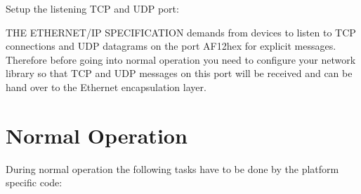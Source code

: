 \begin{DoxyEnumerate}
\item \-Setup the listening \-T\-C\-P and \-U\-D\-P port\-:\par
 \-T\-H\-E \-E\-T\-H\-E\-R\-N\-E\-T/\-I\-P \-S\-P\-E\-C\-I\-F\-I\-C\-A\-T\-I\-O\-N demands from devices to listen to \-T\-C\-P connections and \-U\-D\-P datagrams on the port \-A\-F12hex for explicit messages. \-Therefore before going into normal operation you need to configure your network library so that \-T\-C\-P and \-U\-D\-P messages on this port will be received and can be hand over to the \-Ethernet encapsulation layer.
\end{DoxyEnumerate}\hypertarget{dc/dcb/porting_normal_op_sec}{}\section{\-Normal Operation}\label{dc/dcb/porting_normal_op_sec}
\-During normal operation the following tasks have to be done by the platform specific code\-:
